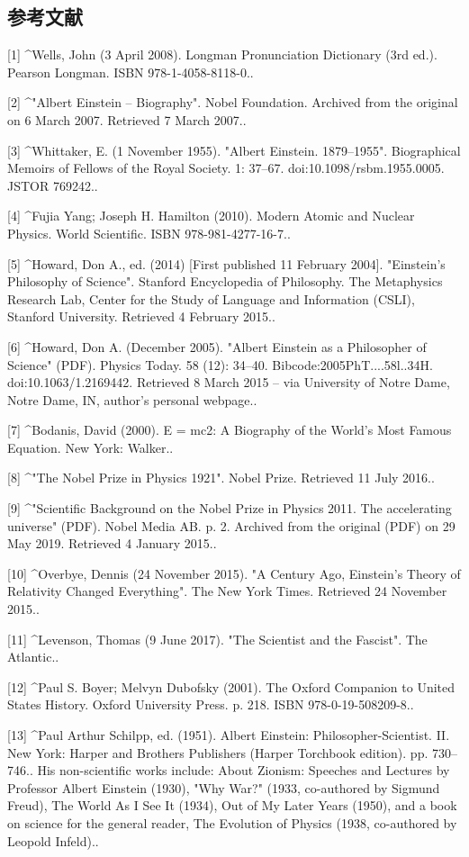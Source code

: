 \subsection{参考文献}
[1]
^Wells, John (3 April 2008). Longman Pronunciation Dictionary (3rd ed.). Pearson Longman. ISBN 978-1-4058-8118-0..

[2]
^"Albert Einstein – Biography". Nobel Foundation. Archived from the original on 6 March 2007. Retrieved 7 March 2007..

[3]
^Whittaker, E. (1 November 1955). "Albert Einstein. 1879–1955". Biographical Memoirs of Fellows of the Royal Society. 1: 37–67. doi:10.1098/rsbm.1955.0005. JSTOR 769242..

[4]
^Fujia Yang; Joseph H. Hamilton (2010). Modern Atomic and Nuclear Physics. World Scientific. ISBN 978-981-4277-16-7..

[5]
^Howard, Don A., ed. (2014) [First published 11 February 2004]. "Einstein's Philosophy of Science". Stanford Encyclopedia of Philosophy. The Metaphysics Research Lab, Center for the Study of Language and Information (CSLI), Stanford University. Retrieved 4 February 2015..

[6]
^Howard, Don A. (December 2005). "Albert Einstein as a Philosopher of Science" (PDF). Physics Today. 58 (12): 34–40. Bibcode:2005PhT....58l..34H. doi:10.1063/1.2169442. Retrieved 8 March 2015 – via University of Notre Dame, Notre Dame, IN, author's personal webpage..

[7]
^Bodanis, David (2000). E = mc2: A Biography of the World's Most Famous Equation. New York: Walker..

[8]
^"The Nobel Prize in Physics 1921". Nobel Prize. Retrieved 11 July 2016..

[9]
^"Scientific Background on the Nobel Prize in Physics 2011. The accelerating universe" (PDF). Nobel Media AB. p. 2. Archived from the original (PDF) on 29 May 2019. Retrieved 4 January 2015..

[10]
^Overbye, Dennis (24 November 2015). "A Century Ago, Einstein's Theory of Relativity Changed Everything". The New York Times. Retrieved 24 November 2015..

[11]
^Levenson, Thomas (9 June 2017). "The Scientist and the Fascist". The Atlantic..

[12]
^Paul S. Boyer; Melvyn Dubofsky (2001). The Oxford Companion to United States History. Oxford University Press. p. 218. ISBN 978-0-19-508209-8..

[13]
^Paul Arthur Schilpp, ed. (1951). Albert Einstein: Philosopher-Scientist. II. New York: Harper and Brothers Publishers (Harper Torchbook edition). pp. 730–746.. His non-scientific works include: About Zionism: Speeches and Lectures by Professor Albert Einstein (1930), "Why War?" (1933, co-authored by Sigmund Freud), The World As I See It (1934), Out of My Later Years (1950), and a book on science for the general reader, The Evolution of Physics (1938, co-authored by Leopold Infeld)..

